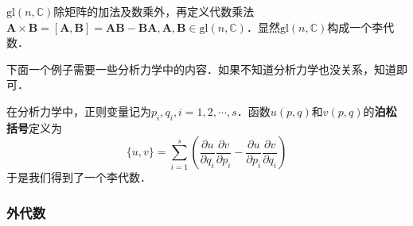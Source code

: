 \begin{example}{}
$\mathrm{gl}(n, \mathbb C)$除矩阵的加法及数乘外，再定义代数乘法$\mathbf A\times \mathbf B=[\mathbf A, \mathbf B] = \mathbf A \mathbf B - \mathbf B\mathbf A, \mathbf A, \mathbf B\in \mathrm{gl}(n, \mathbb C)$．显然$\mathrm{gl}(n,\mathbb C)$构成一个李代数．
\end{example}


下面一个例子需要一些分析力学中的内容．如果不知道分析力学也没关系，知道即可．
\begin{example}{}
在分析力学中，正则变量记为$p_i,q_i, i=1,2,\cdots, s$．函数$u(p,q)$和$v(p, q)$的\textbf{泊松括号}定义为\begin{equation}
\{u, v\}=\sum_{i=1}^{s}\left(\frac{\partial u}{\partial q_{i}} \frac{\partial v}{\partial p_{i}}-\frac{\partial u}{\partial p_{i}} \frac{\partial v}{\partial q_{i}}\right)
\end{equation}
于是我们得到了一个李代数．

\addTODO



\end{example}

\subsubsection{外代数}

